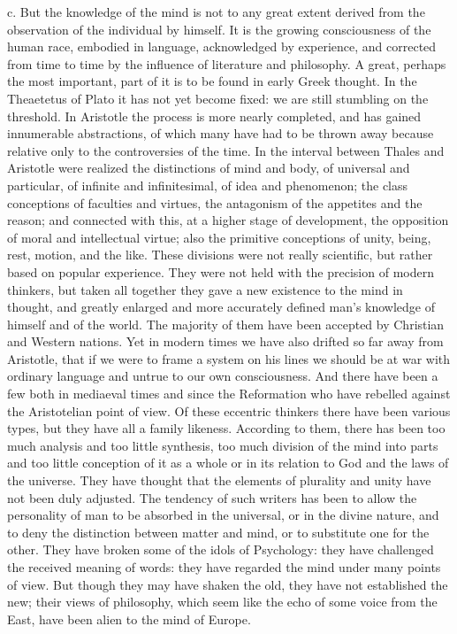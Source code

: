 \documentclass[11pt,letter]{article}
\begin{document}
\par  c. But the knowledge of the mind is not to any great extent derived from the observation of the individual by himself. It is the growing consciousness of the human race, embodied in language, acknowledged by experience, and corrected from time to time by the influence of literature and philosophy. A great, perhaps the most important, part of it is to be found in early Greek thought. In the Theaetetus of Plato it has not yet become fixed: we are still stumbling on the threshold. In Aristotle the process is more nearly completed, and has gained innumerable abstractions, of which many have had to be thrown away because relative only to the controversies of the time. In the interval between Thales and Aristotle were realized the distinctions of mind and body, of universal and particular, of infinite and infinitesimal, of idea and phenomenon; the class conceptions of faculties and virtues, the antagonism of the appetites and the reason; and connected with this, at a higher stage of development, the opposition of moral and intellectual virtue; also the primitive conceptions of unity, being, rest, motion, and the like. These divisions were not really scientific, but rather based on popular experience. They were not held with the precision of modern thinkers, but taken all together they gave a new existence to the mind in thought, and greatly enlarged and more accurately defined man's knowledge of himself and of the world. The majority of them have been accepted by Christian and Western nations. Yet in modern times we have also drifted so far away from Aristotle, that if we were to frame a system on his lines we should be at war with ordinary language and untrue to our own consciousness. And there have been a few both in mediaeval times and since the Reformation who have rebelled against the Aristotelian point of view. Of these eccentric thinkers there have been various types, but they have all a family likeness. According to them, there has been too much analysis and too little synthesis, too much division of the mind into parts and too little conception of it as a whole or in its relation to God and the laws of the universe. They have thought that the elements of plurality and unity have not been duly adjusted. The tendency of such writers has been to allow the personality of man to be absorbed in the universal, or in the divine nature, and to deny the distinction between matter and mind, or to substitute one for the other. They have broken some of the idols of Psychology: they have challenged the received meaning of words: they have regarded the mind under many points of view. But though they may have shaken the old, they have not established the new; their views of philosophy, which seem like the echo of some voice from the East, have been alien to the mind of Europe.
\end{document}
